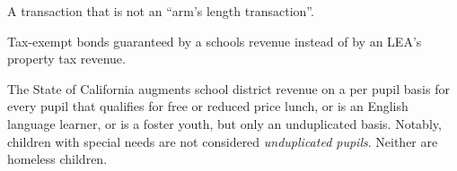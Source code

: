 \begin{description}[nosep]
\medskip\item[related party transaction]  A transaction that is not an ``arm's length transaction''. \parencite{Kenton2022}

\medskip\item[revenue bonds] Tax-exempt bonds guaranteed by a schools revenue instead of by an LEA's property tax revenue. \parencite{Chen2021}

\medskip\item[unduplicated pupils] The State of California augments school district revenue on a per pupil basis for every pupil that qualifies for free or reduced price lunch, or is an English language learner, or is a foster youth, but only an unduplicated basis. Notably, children with special needs are not considered \textit{unduplicated pupils}. Neither are homeless children. \parencite{CDE2015}

\end{description}


